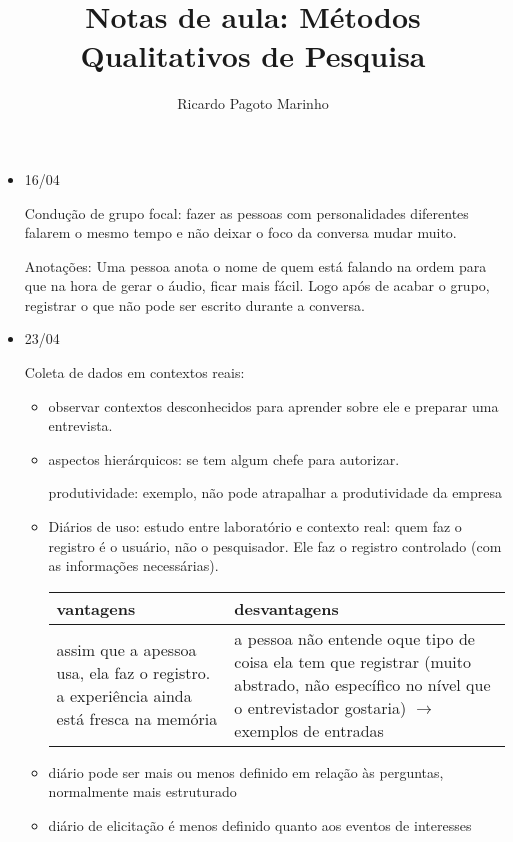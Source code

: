 \documentclass[11pt,a4paper]{book}
\title{Notas de aula: Métodos Qualitativos de Pesquisa}
\author{Ricardo Pagoto Marinho}
\begin{document}
\maketitle
	\begin{itemize}
		\item 16/04
		
		Condução de grupo focal: fazer as pessoas com personalidades diferentes falarem o mesmo tempo e não deixar o foco da conversa mudar muito.
		
		Anotações: Uma pessoa anota o nome de quem está falando na ordem para que na hora de gerar o áudio, ficar mais fácil.
		Logo após de acabar o grupo, registrar o que não pode ser escrito durante a conversa.
		
		\item 23/04
		
		Coleta de dados em contextos reais:
		
		\begin{itemize}
			\item observar contextos desconhecidos para aprender sobre ele e preparar uma entrevista.
			
			\item aspectos hierárquicos: se tem algum chefe para autorizar.
			
			produtividade: exemplo, não pode atrapalhar a produtividade da empresa
			
			\item Diários de uso: estudo entre laboratório e contexto real: quem faz o registro é o usuário, não o pesquisador.
			Ele faz o registro controlado (com as informações necessárias).
			
			
			\begin{tabular}{|p{4cm}|p{4cm}|}
			\hline
			vantagens & desvantagens\\
			\hline
			assim que a apessoa usa, ela faz o registro. a experiência ainda está fresca na memória & a pessoa não entende oque tipo de coisa ela tem que registrar (muito abstrado, não específico no nível que o entrevistador gostaria) $\rightarrow$ exemplos de entradas\\
			\hline
			\end{tabular}
			
			\item diário pode ser mais ou menos definido em relação às perguntas, normalmente mais estruturado
			
			\item diário de elicitação é menos definido quanto aos eventos de interesses
			

\end{itemize}
\end{itemize}
\end{document}
